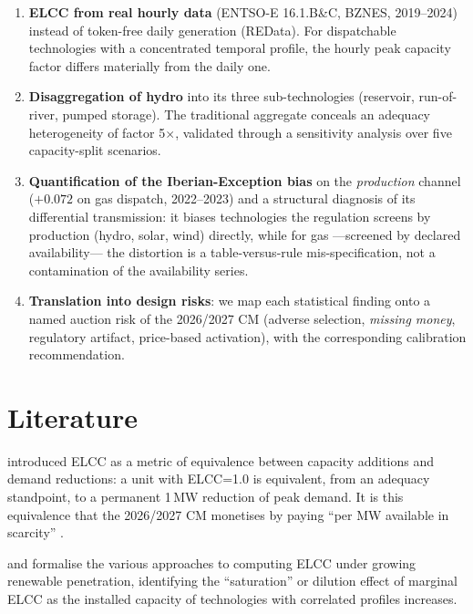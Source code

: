\documentclass[11pt,a4paper]{article}
\begin{document}
\begin{enumerate}
\item \textbf{ELCC from real hourly data} (ENTSO-E 16.1.B\&C, BZN\textbar ES,
      2019--2024) instead of token-free daily generation (REData). For
      dispatchable technologies with a concentrated temporal profile, the hourly
      peak capacity factor differs materially from the daily one.
\item \textbf{Disaggregation of hydro} into its three sub-technologies (reservoir,
      run-of-river, pumped storage). The traditional aggregate conceals an adequacy
      heterogeneity of factor 5$\times$, validated through a sensitivity analysis
      over five capacity-split scenarios.
\item \textbf{Quantification of the Iberian-Exception bias} on the \emph{production}
      channel ($+0.072$ on gas dispatch, 2022--2023) and a structural diagnosis of its
      differential transmission: it biases technologies the regulation screens by
      production (hydro, solar, wind) directly, while for gas ---screened by declared
      availability--- the distortion is a table-versus-rule mis-specification, not a
      contamination of the availability series.
\item \textbf{Translation into design risks}: we map each statistical finding onto
      a named auction risk of the 2026/2027 CM (adverse selection, \emph{missing
      money}, regulatory artifact, price-based activation), with the corresponding
      calibration recommendation.
\end{enumerate}

\section{Literature}

\citet{garver1966} introduced ELCC as a metric of equivalence between capacity
additions and demand reductions: a unit with ELCC=1.0 is equivalent, from an
adequacy standpoint, to a permanent 1\,MW reduction of peak demand. It is this
equivalence that the 2026/2027 CM monetises by paying ``per MW available in scarcity''
\citep{ec2026sa112483}.

\citet{millswiser2013} and \citet{madaeni2013} formalise the various approaches to
computing ELCC under growing renewable penetration, identifying the
``saturation'' or dilution effect of marginal ELCC as the installed capacity of
technologies with correlated profiles increases.
\end{document}
